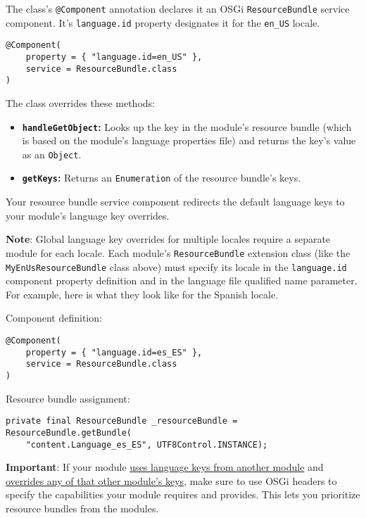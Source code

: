 The class's \texttt{@Component} annotation declares it an OSGi
\texttt{ResourceBundle} service component. It's \texttt{language.id}
property designates it for the \texttt{en\_US} locale.

\begin{verbatim}
@Component(
    property = { "language.id=en_US" }, 
    service = ResourceBundle.class
)
\end{verbatim}

The class overrides these methods:

\begin{itemize}
\item
  \textbf{\texttt{handleGetObject}:} Looks up the key in the module's
  resource bundle (which is based on the module's language properties
  file) and returns the key's value as an \texttt{Object}.
\item
  \textbf{\texttt{getKeys}:} Returns an \texttt{Enumeration} of the
  resource bundle's keys.
\end{itemize}

Your resource bundle service component redirects the default language
keys to your module's language key overrides.

\noindent\hrulefill

\textbf{Note}: Global language key overrides for multiple locales
require a separate module for each locale. Each module's
\texttt{ResourceBundle} extension class (like the
\texttt{MyEnUsResourceBundle} class above) must specify its locale in
the \texttt{language.id} component property definition and in the
language file qualified name parameter. For example, here is what they
look like for the Spanish locale.

Component definition:

\begin{verbatim}
@Component(
    property = { "language.id=es_ES" },
    service = ResourceBundle.class
)
\end{verbatim}

Resource bundle assignment:

\begin{verbatim}
private final ResourceBundle _resourceBundle = ResourceBundle.getBundle(
    "content.Language_es_ES", UTF8Control.INSTANCE);
\end{verbatim}

\noindent\hrulefill

\textbf{Important}: If your module
\href{/docs/7-2/frameworks/-/knowledge_base/f/using-a-language-module}{uses
language keys from another module} and
\href{/docs/7-2/frameworks/-/knowledge_base/f/using-a-language-module}{overrides
any of that other module's keys}, make sure to use OSGi headers to
specify the capabilities your module requires and provides. This lets
you prioritize resource bundles from the modules.


